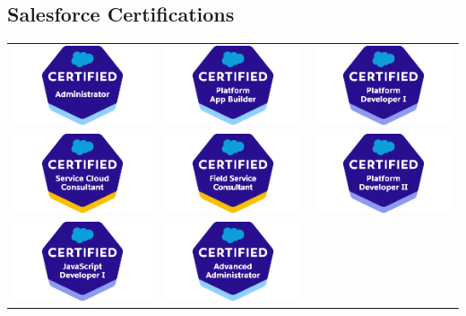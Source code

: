 \documentclass[a4paper, oneside, final]{scrartcl} %
\begin{document}
\begin{center}
\section{Salesforce Certifications}

 \begin{table}[H]
            \centering
                \begin{tabular}{ccc}
                     \includegraphics[width=0.2\linewidth]{admin1.png}
                    & \includegraphics[width=0.2\linewidth]{appbuilder.png}
                    & \includegraphics[width=0.2\linewidth]{pd1.png}\\[-4pt]
                     \includegraphics[width=0.2\linewidth]{service.png}
                    & \includegraphics[width=0.2\linewidth]{fsl.png}
                    & \includegraphics[width=0.2\linewidth]{pd2.png}\\[-4pt]
                     \includegraphics[width=0.2\linewidth]{js1.png}
                     & \includegraphics[width=0.2\linewidth]{admin2.png}

\end{tabular}
\end{table}
\end{center}
\end{document}
